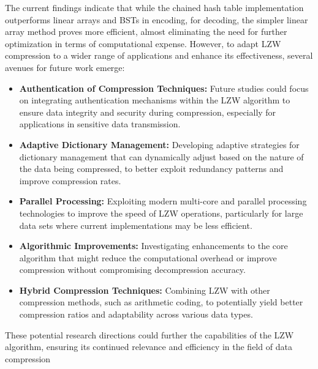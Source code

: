 \documentclass[12pt, a4paper]{article}
\begin{document}
    
    


The current findings indicate that while the chained hash table implementation outperforms linear arrays and BSTs in encoding, for decoding, the simpler linear array method proves more efficient, almost eliminating the need for further optimization in terms of computational expense. However, to adapt LZW compression to a wider range of applications and enhance its effectiveness, several avenues for future work emerge:

\begin{itemize}
  \item \textbf{Authentication of Compression Techniques:} Future studies could focus on integrating authentication mechanisms within the LZW algorithm to ensure data integrity and security during compression, especially for applications in sensitive data transmission.
  \item \textbf{Adaptive Dictionary Management:} Developing adaptive strategies for dictionary management that can dynamically adjust based on the nature of the data being compressed, to better exploit redundancy patterns and improve compression rates.
  \item \textbf{Parallel Processing:} Exploiting modern multi-core and parallel processing technologies to improve the speed of LZW operations, particularly for large data sets where current implementations may be less efficient.
  \item \textbf{Algorithmic Improvements:} Investigating enhancements to the core algorithm that might reduce the computational overhead or improve compression without compromising decompression accuracy.
  \item \textbf{Hybrid Compression Techniques:} Combining LZW with other compression methods, such as arithmetic coding, to potentially yield better compression ratios and adaptability across various data types.
\end{itemize}

These potential research directions could further the capabilities of the LZW algorithm, ensuring its continued relevance and efficiency in the field of data compression


    
\end{document}
